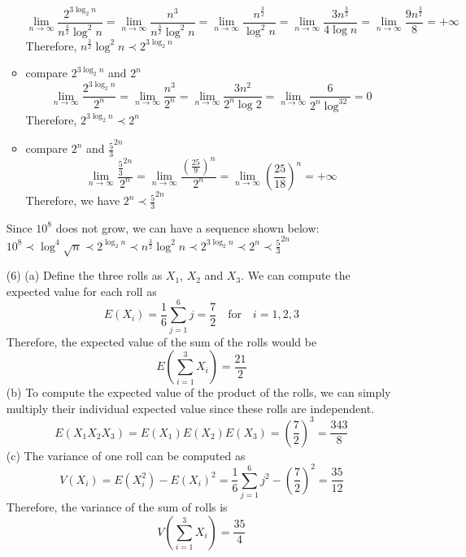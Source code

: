 \documentclass[11pt]{article}
\begin{document}
\begin{itemize}
\begin{itemize}
\begin{equation*}
\lim_{n\to\infty} \frac{2^{3\log_2n}}{n^{\frac{3}{2}}\log^2n}=\lim_{n\to\infty} \frac{n^3}{n^{\frac{3}{2}}\log^2n} = \lim_{n\to\infty} \frac{n^{\frac{3}{2}}}{\log^2n}=\lim_{n\to\infty} \frac{3n^{\frac{3}{2}}}{4\log n} =\lim_{n\to\infty} \frac{9n^{\frac{3}{2}}}{8} =+\infty
\end{equation*}
Therefore, \(n^{\frac{3}{2}}\log^2n \prec 2^{3\log_2n}\)\\
\item compare \(2^{3\log_2n}\) and \(2^n\)\\
\begin{equation*}
\lim_{n\to\infty} \frac{2^{3\log_2n}}{2^n}=\lim_{n\to\infty} \frac{n^3}{2^n} = \lim_{n\to\infty} \frac{3n^2}{2^n\log2}= \lim_{n\to\infty} \frac{6}{2^n\log^32}=0
\end{equation*}
Therefore,  \(2^{3\log_2n} \prec 2^n \)\\
\item compare \(2^n\) and \(\frac{5}{3}^{2n}\)\\
\begin{equation*}
\lim_{n\to\infty} \frac{\frac{5}{3}^{2n}}{2^n} = \lim_{n\to\infty} \frac{(\frac{25}{9})^n}{2^n} = \lim_{n\to\infty} (\frac{25}{18})^n = +\infty
\end{equation*}
Therefore, we have \(2^n \prec \frac{5}{3}^{2n} \)\\
\end{itemize}
Since \(10^8\) does not grow, we can have a sequence shown below:\\
\( 10^8 \prec \log^4\sqrt{n} \prec 2^{\log_2n} \prec  n^{\frac{3}{2}}\log^2n  \prec  2^{3\log_2n} \prec 2^n \prec \frac{5}{3}^{2n} \)
\item[(6)] (a) Define the three rolls as \(X_1\), \(X_2\) and \(X_3\). We can compute the expected value for each roll as
\begin{equation*}
E(X_i)=\frac{1}{6} \sum_{j=1}^{6} j = \frac{7}{2} \quad \textrm{for} \quad i=1,2,3
\end{equation*}
Therefore, the expected value of the sum of the rolls would be 
\begin{equation*}
E(\sum_{i=1}^{3} X_i)=\frac{21}{2}
\end{equation*}
(b) To compute the expected value of the product of the rolls, we can simply multiply their individual expected value since these rolls are independent.
\begin{equation*}
E(X_1X_2X_3)=E(X_1)E(X_2)E(X_3)=(\frac{7}{2})^3=\frac{343}{8}
\end{equation*}
(c) The variance of one roll can be computed as 
\begin{equation*}
V(X_i)=E(X_i^2)-E(X_i)^2 = \frac{1}{6}\sum_{j=1}^{6} j^2 - (\frac{7}{2})^2 = \frac{35}{12}
\end{equation*}
Therefore, the variance of the sum of rolls is
\begin{equation*}
V(\sum_{i=1}^{3} X_i)=\frac{35}{4}
\end{equation*}
\end{itemize}
\end{document}
